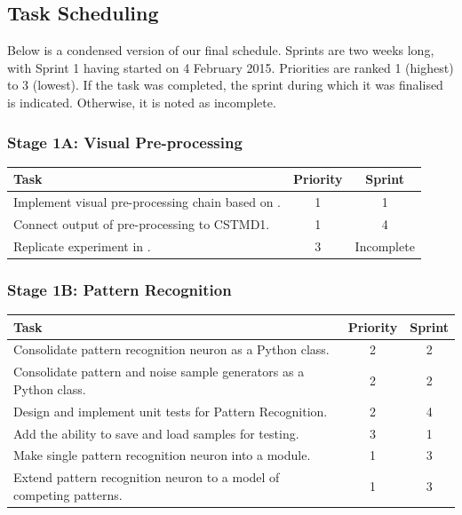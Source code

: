 \documentclass[a4paper,11pt]{article}
\begin{document}
\subsection{Task Scheduling}

Below is a condensed version of our final schedule. Sprints are two weeks long, with Sprint 1 having started on 4 February 2015. Priorities are ranked 1 (highest) to 3 (lowest). If the task was completed, the sprint during which it was finalised is indicated. Otherwise, it is noted as incomplete.

\subsubsection{Stage 1A: Visual Pre-processing}
\begin{center}
    \begin{tabular}{p{12cm} c c}
    \textbf{Task} & \textbf{Priority} & \textbf{Sprint} \\ \hline
	Implement visual pre-processing chain based on \cite{hal11}. & 1 & 1 \\
	Connect output of pre-processing to CSTMD1. & 1 & 4\\
	Replicate experiment in \cite{w13}. & 3 & Incomplete \\
    \end{tabular}
\end{center}

\subsubsection{Stage 1B: Pattern Recognition}
\begin{center}
    \begin{tabular}{p{12cm} c c}
    \textbf{Task} & \textbf{Priority} & \textbf{Sprint} \\ \hline
	Consolidate pattern recognition neuron as a Python class. & 2 & 2 \\
	Consolidate pattern and noise sample generators as a Python class. & 2 & 2 \\
	Design and implement unit tests for Pattern Recognition. & 2 & 4 \\
	Add the ability to save and load samples for testing. & 3 & 1 \\
	Make single pattern recognition neuron into a module. & 1 & 3 \\
	Extend pattern recognition neuron to a model of competing patterns. & 1 & 3 \\
    \end{tabular}
\end{center}
\end{document}
